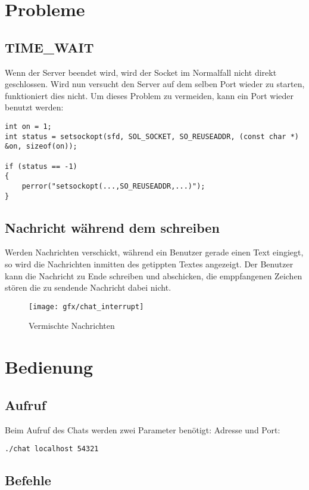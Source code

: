 \documentclass[a4paper]{article}
\begin{document}
\section{Probleme}
\subsection{TIME\_WAIT}
Wenn der Server beendet wird, wird der Socket im Normalfall nicht direkt geschlossen. Wird nun versucht den Server auf dem selben Port wieder zu starten, funktioniert dies nicht. Um dieses Problem zu vermeiden, kann ein Port wieder benutzt werden:

\begin{verbatim}
int on = 1;
int status = setsockopt(sfd, SOL_SOCKET, SO_REUSEADDR, (const char *) &on, sizeof(on));

if (status == -1) 
{   
    perror("setsockopt(...,SO_REUSEADDR,...)");
}
\end{verbatim}

\subsection{Nachricht während dem schreiben}
Werden Nachrichten verschickt, während ein Benutzer gerade einen Text eingiegt, so wird die Nachrichten inmitten des getippten Textes angezeigt. Der Benutzer kann die Nachricht zu Ende schreiben und abschicken, die emppfangenen Zeichen stören die zu sendende Nachricht dabei nicht.

\begin{figure}[H]
    \centering
    \texttt{[image: gfx/chat\_interrupt]}
    \caption{Vermischte Nachrichten}
    \label{img:chat_interrupt}
\end{figure}

\section{Bedienung}
\subsection{Aufruf}
Beim Aufruf des Chats werden zwei Parameter benötigt: Adresse und Port:

\texttt{./chat localhost 54321}

\subsection{Befehle}
\end{document}
